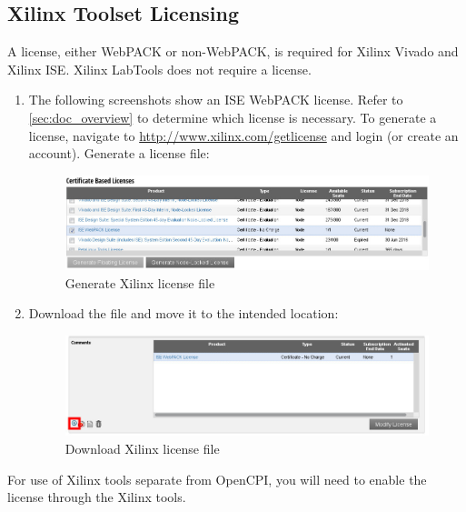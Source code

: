 \subsection{Xilinx Toolset Licensing}
\label{xilinx}
A license, either WebPACK or non-WebPACK, is required for Xilinx Vivado and Xilinx ISE. Xilinx LabTools does not require a license.
\begin{enumerate}
\item The following screenshots show an ISE WebPACK license. Refer to \ref{sec:doc_overview} to determine which license is necessary. To generate a license, navigate to \url{http://www.xilinx.com/getlicense} and login (or create an account). Generate a license file:

\begin{figure}[H]
	\centerline{\includegraphics[scale=0.5]{./figures/xilinx_license_gen.jpg}}
	\caption{Generate Xilinx license file}
\end{figure}

\item Download the file and move it to the intended location:

\begin{figure}[H]
	\centerline{\includegraphics[scale=0.5]{./figures/xilinx_license_download.jpg}}
	\caption{Download Xilinx license file}
\end{figure}
\end{enumerate}

For use of Xilinx tools separate from OpenCPI, you will need to enable the license through the Xilinx tools.\newline

